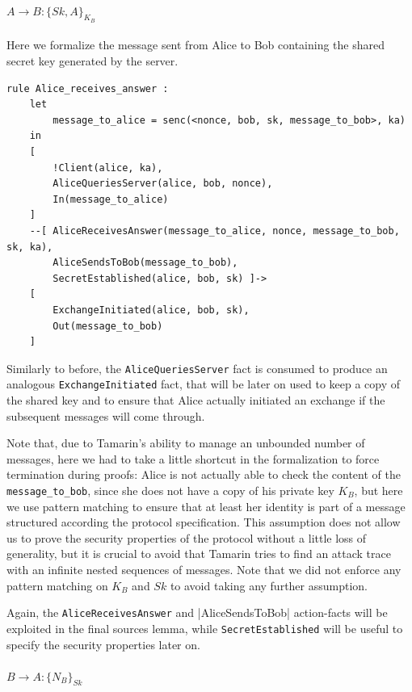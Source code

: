 \documentclass[fleqn,10pt]{SelfArx} %
\begin{document}
\paragraph{$A \to B: \{Sk, A\}_{K_B}$}

Here we formalize the message sent from Alice to Bob containing the shared secret key generated by the server.

\begin{lstlisting}[language=Tamarin]
rule Alice_receives_answer :
    let
        message_to_alice = senc(<nonce, bob, sk, message_to_bob>, ka)
    in
    [
        !Client(alice, ka),
        AliceQueriesServer(alice, bob, nonce),
        In(message_to_alice)
    ]
    --[ AliceReceivesAnswer(message_to_alice, nonce, message_to_bob, sk, ka),
        AliceSendsToBob(message_to_bob),
        SecretEstablished(alice, bob, sk) ]->
    [
        ExchangeInitiated(alice, bob, sk),
        Out(message_to_bob)
    ]
\end{lstlisting}

Similarly to before, the \lstinline|AliceQueriesServer| fact is consumed to produce an analogous \lstinline|ExchangeInitiated| fact, that will be later on used to keep a copy of the shared key and to ensure that Alice actually initiated an exchange if the subsequent messages will come through.

Note that, due to Tamarin's ability to manage an unbounded number of messages, here we had to take a little shortcut in the formalization to force termination during proofs: Alice is not actually able to check the content of the \lstinline|message_to_bob|, since she does not have a copy of his private key $K_B$, but here we use pattern matching to ensure that at least her identity is part of a message structured according the protocol specification. This assumption does not allow us to prove the security properties of the protocol without a little loss of generality, but it is crucial to avoid that Tamarin tries to find an attack trace with an infinite nested sequences of messages. Note that we did not enforce any pattern matching on $K_B$ and $Sk$ to avoid taking any further assumption.

Again, the \lstinline|AliceReceivesAnswer| and |AliceSendsToBob| action-facts will be exploited in the final sources lemma, while \lstinline|SecretEstablished| will be useful to specify the security properties later on.

\paragraph{$B \to A: \{N_B\}_{Sk}$}
\end{document}
